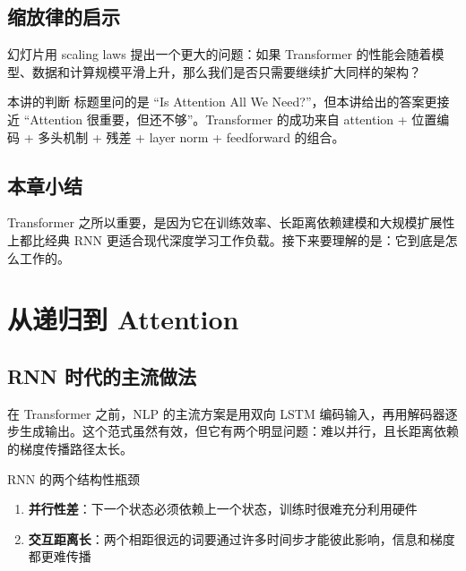 \documentclass[a4paper]{article}
\begin{document}







\subsection{缩放律的启示}

幻灯片用 scaling laws 提出一个更大的问题：如果 Transformer 的性能会随着模型、数据和计算规模平滑上升，那么我们是否只需要继续扩大同样的架构？





\begin{importantbox}{本讲的判断}
标题里问的是 ``Is Attention All We Need?''，但本讲给出的答案更接近 ``Attention 很重要，但还不够''。Transformer 的成功来自 attention + 位置编码 + 多头机制 + 残差 + layer norm + feedforward 的组合。
\end{importantbox}

\subsection{本章小结}

Transformer 之所以重要，是因为它在训练效率、长距离依赖建模和大规模扩展性上都比经典 RNN 更适合现代深度学习工作负载。接下来要理解的是：它到底是怎么工作的。


\section{从递归到 Attention}

\subsection{RNN 时代的主流做法}

在 Transformer 之前，NLP 的主流方案是用双向 LSTM 编码输入，再用解码器逐步生成输出。这个范式虽然有效，但它有两个明显问题：难以并行，且长距离依赖的梯度传播路径太长。









\begin{importantbox}{RNN 的两个结构性瓶颈}
\begin{enumerate}
    \item \textbf{并行性差}：下一个状态必须依赖上一个状态，训练时很难充分利用硬件
    \item \textbf{交互距离长}：两个相距很远的词要通过许多时间步才能彼此影响，信息和梯度都更难传播
\end{enumerate}
\end{importantbox}
\end{document}
